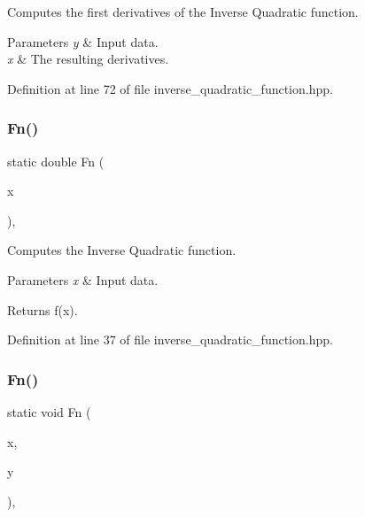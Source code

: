 Computes the first derivatives of the Inverse Quadratic function. 


\begin{DoxyParams}{Parameters}
{\em y} & Input data. \\
\hline
{\em x} & The resulting derivatives. \\
\hline
\end{DoxyParams}


Definition at line 72 of file inverse\+\_\+quadratic\+\_\+function.\+hpp.

\mbox{\label{classmlpack_1_1ann_1_1InvQuadFunction_a11bd9a1195e6b107f9fee73643bc328b}} 
\subsubsection{Fn()\hspace{0.1cm}{\footnotesize\ttfamily [1/2]}}
{\footnotesize\ttfamily static double Fn (\begin{DoxyParamCaption}\item[{const double}]{x }\end{DoxyParamCaption})\hspace{0.3cm}{\ttfamily [inline]}, {\ttfamily [static]}}



Computes the Inverse Quadratic function. 


\begin{DoxyParams}{Parameters}
{\em x} & Input data. \\
\hline
\end{DoxyParams}
\begin{DoxyReturn}{Returns}
f(x). 
\end{DoxyReturn}


Definition at line 37 of file inverse\+\_\+quadratic\+\_\+function.\+hpp.

\mbox{\label{classmlpack_1_1ann_1_1InvQuadFunction_af6cf5da90eb6312e3e25c9b8bd9c3527}} 
\subsubsection{Fn()\hspace{0.1cm}{\footnotesize\ttfamily [2/2]}}
{\footnotesize\ttfamily static void Fn (\begin{DoxyParamCaption}\item[{const Input\+Vec\+Type \&}]{x,  }\item[{Output\+Vec\+Type \&}]{y }\end{DoxyParamCaption})\hspace{0.3cm}{\ttfamily [inline]}, {\ttfamily [static]}}



